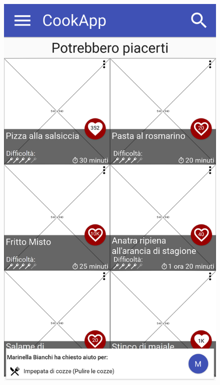 \begin{figure}[H]
\begin{minipage}{.49\textwidth}
		\includegraphics[width=\textwidth]{img/wireframe/homepage_aiuto_passo_ricetta.png}
	\end{minipage}
\end{figure}

